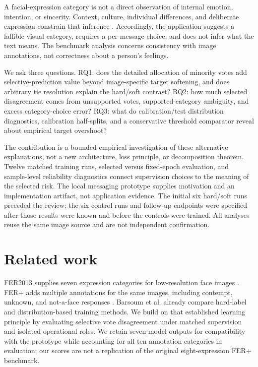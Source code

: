 \documentclass[pdflatex,sn-mathphys-num]{sn-jnl}
\begin{document}
A facial-expression category is not a direct observation of internal emotion, intention, or sincerity. Context, culture, individual differences, and deliberate expression constrain that inference \cite{barrett2019emotions}. Accordingly, the application suggests a fallible visual category, requires a per-message choice, and does not infer what the text means. The benchmark analysis concerns consistency with image annotations, not correctness about a person's feelings.

We ask three questions. RQ1: does the detailed allocation of minority votes add selective-prediction value beyond image-specific target softening, and does arbitrary tie resolution explain the hard/soft contrast? RQ2: how much selected disagreement comes from unsupported votes, supported-category ambiguity, and excess category-choice error? RQ3: what do calibration/test distribution diagnostics, calibration half-splits, and a conservative threshold comparator reveal about empirical target overshoot?

The contribution is a bounded empirical investigation of these alternative explanations, not a new architecture, loss principle, or decomposition theorem. Twelve matched training runs, selected versus fixed-epoch evaluation, and sample-level reliability diagnostics connect supervision choices to the meaning of the selected risk. The local messaging prototype supplies motivation and an implementation artifact, not application evidence. The initial six hard/soft runs preceded the review; the six control runs and follow-up endpoints were specified after those results were known and before the controls were trained. All analyses reuse the same image source and are not independent confirmation.

\section{Related work}
FER2013 supplies seven expression categories for low-resolution face images \cite{goodfellow2013fer}. FER+ adds multiple annotations for the same images, including contempt, unknown, and not-a-face responses \cite{barsoum2016ferplus}. Barsoum et al. already compare hard-label and distribution-based training methods. We build on that established learning principle by evaluating selective vote disagreement under matched supervision and isolated operational roles. We retain seven model outputs for compatibility with the prototype while accounting for all ten annotation categories in evaluation; our scores are not a replication of the original eight-expression FER+ benchmark.
\end{document}
